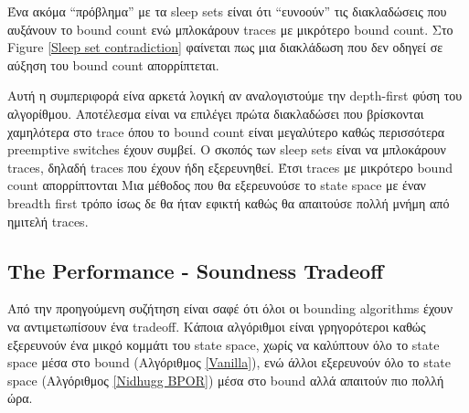 Ένα ακόμα  ``πρόβλημα'' με τα sleep sets είναι ότι  ``ευνοούν'' τις διακλαδώσεις που αυξάνουν το bound count ενώ μπλοκάρουν
traces με μικρότερο bound count. Στο Figure \ref{Sleep set contradiction} φαίνεται πως μια διακλάδωση που δεν οδηγεί
σε αύξηση του bound count απορρίπτεται.


Αυτή η συμπεριφορά είνα αρκετά λογική αν αναλογιστούμε την depth-first φύση του αλγορίθμου.
Αποτέλεσμα είναι να επιλέγει πρώτα διακλαδώσει που βρίσκονται χαμηλότερα στο trace 
όπου το bound count είναι μεγαλύτερο καθώς περισσότερα preemptive switches έχουν συμβεί. Ο σκοπός των sleep
sets είναι να μπλοκάρουν traces, δηλαδή traces που έχουν ήδη εξερευνηθεί. Έτσι traces με μικρότερο bound count απορρίπτονται
Μια μέθοδος που θα εξερευνούσε το state space με έναν breadth first τρόπο ίσως δε θα ήταν εφικτή καθώς θα απαιτούσε
πολλή μνήμη από ημιτελή traces.

\iffalse
\subsection{Source Sets - Optimal DPOR}
The source set technique which can lead many times to optimal coverage of the state space manages avoid the exploration
of redundant sets. However as it was discussed in the previous section it avoids the scheduling of the traces.
Unfortunately it cannot be used in the when conservative branches are added since these branches are not related to the
sleep sets. As a result the conservative branches alone will never lead to sleep set blocked traces.

However, in many test cases there are some sleep set blocked traces which are caused by conditional reads and writes.
When a technique which does not utilize the sleep sets is to be used these traces would have been easily eliminated.
Unfortunately, it was experimentally shown that explored traces outnumber the sleepset blocked traces and, consequently,
the implementation of such an algorithm would have a minor impact.

Moreover, we have shown that even if we maintain the source-set optimization for the non-conservative branches the
results will be equivalent with using persistent sets. The idea of keeping the rejected traces from Source-DPOR that
would have been added from DPOR (with persistent sets) was rejected since it harms the soundness of the algorithm.
\fi

\subsection {The Performance - Soundness Tradeoff}

Από την προηγούμενη συζήτηση είναι σαφέ ότι όλοι οι bounding algorithms έχουν να αντιμετωπίσουν ένα tradeoff. Κάποια αλγόριθμοι είναι γρηγορότεροι
καθώς εξερευνούν ένα μικϱό κομμάτι του state space, χωρίς να καλύπτουν όλο το state space μέσα στο bound (Αλγόριθμος \ref{Vanilla}), 
ενώ άλλοι εξερευνούν όλο το state space (Αλγόριθμος \ref{Nidhugg BPOR}) μέσα στο bound αλλά απαιτούν πιο πολλή ώρα.
